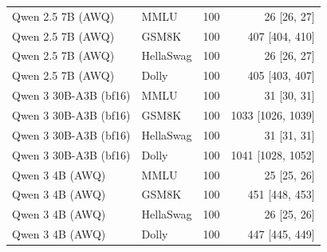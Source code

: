 \begin{longtable}{@{}l l r r@{}}
Qwen 2.5 7B (AWQ) & MMLU & 100 & 26 [26, 27] \\
Qwen 2.5 7B (AWQ) & GSM8K & 100 & 407 [404, 410] \\
Qwen 2.5 7B (AWQ) & HellaSwag & 100 & 26 [26, 27] \\
Qwen 2.5 7B (AWQ) & Dolly & 100 & 405 [403, 407] \\
Qwen 3 30B-A3B (bf16) & MMLU & 100 & 31 [30, 31] \\
Qwen 3 30B-A3B (bf16) & GSM8K & 100 & 1033 [1026, 1039] \\
Qwen 3 30B-A3B (bf16) & HellaSwag & 100 & 31 [31, 31] \\
Qwen 3 30B-A3B (bf16) & Dolly & 100 & 1041 [1028, 1052] \\
Qwen 3 4B (AWQ) & MMLU & 100 & 25 [25, 26] \\
Qwen 3 4B (AWQ) & GSM8K & 100 & 451 [448, 453] \\
Qwen 3 4B (AWQ) & HellaSwag & 100 & 26 [25, 26] \\
Qwen 3 4B (AWQ) & Dolly & 100 & 447 [445, 449] \\
\end{longtable}
